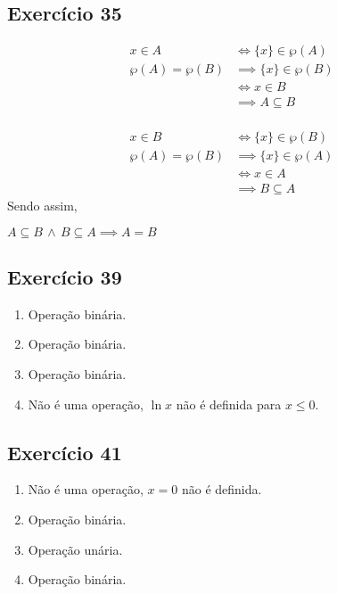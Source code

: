 \documentclass[12pt,a4paper]{article}
\begin{document}
\subsection*{Exercício 35}
\begin{equation*}
\begin{split}
x\in A & \iff \{x\}\in \wp (A) \\
\wp (A) = \wp (B) & \implies \{x\} \in \wp (B) \\
& \iff x \in B \\
& \implies A \subseteq B
\end{split}
\end{equation*} \\
\begin{equation*}
\begin{split}
x\in B & \iff \{x\}\in \wp (B) \\
\wp (A) = \wp (B) & \implies \{x\} \in \wp (A) \\
& \iff x \in A \\
& \implies B \subseteq A
\end{split}
\end{equation*}
Sendo assim,
\begin{center}
$A \subseteq B \,\land\, B \subseteq A \implies A = B$
\end{center}

\subsection*{Exercício 39}
\begin{enumerate}[label=\textbf{\alph*.}]
\item Operação binária.
\item Operação binária.
\item Operação binária.
\item Não é uma operação, $\ln x$ não é definida para $x\leq 0$.
\end{enumerate}
\subsection*{Exercício 41}
\begin{enumerate}[label=\textbf{\alph*.}]
\item Não é uma operação, $x=0$ não é definida.
\item Operação binária.
\item Operação unária.
\item Operação binária.
\end{enumerate}
\end{document}

